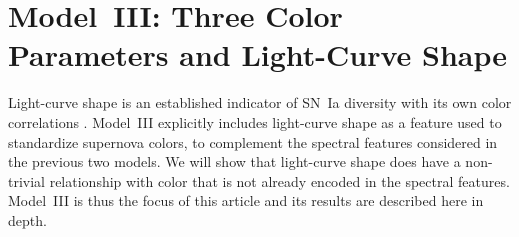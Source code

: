\documentclass[trackchanges]{aastex62}   	%
\begin{document}
\section{Model~III: Three Color Parameters and Light-Curve Shape}
\label{modelIII:sec}

Light-curve shape is an established indicator of SN~Ia diversity 
\citep{1993ApJ...413L.105P, 1996ApJ...473...88R,
1997ApJ...483..565P}
with its own color correlations \citep{2005A&A...443..781G, 2007ApJ...659..122J}.
Model~III explicitly includes light-curve shape as a feature used to standardize supernova colors, to complement the
spectral features considered in the previous two models.
We will show that light-curve shape does have a non-trivial relationship with color that is not already encoded
in the spectral features.  Model~III is thus the focus of
this article and its results are  described here in depth.
\end{document}
